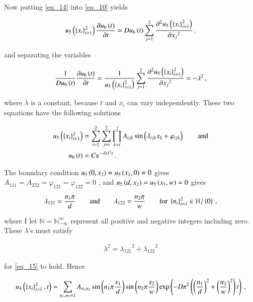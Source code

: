 \documentclass[11pt,english,a4paper]{article}
\begin{document}
\begin{flushleft}
Now putting \eqref{eq_14} into \eqref{eq_10} yields

\begin{align*}
u_5\left({\left\lbrace{x_i}\right\rbrace_{i=1}^2}\right)\frac{\partial u_6\left({t}\right)}{\partial t} = D u_6\left({t}\right)\sum_{j=1}^2\frac{\partial^2 u_5\left({\left\lbrace{x_i}\right\rbrace_{i=1}^2}\right)}{\partial {x_j}^2} \,.
\end{align*}

and separating the variables

\begin{align}
\frac{1}{Du_6\left({t}\right)} \frac{\partial u_6\left({t}\right)}{\partial t} = \frac{1}{u_5\left({\left\lbrace{x_i}\right\rbrace_{i=1}^2}\right)}\sum_{j=1}^2\frac{\partial^2 u_5\left({\left\lbrace{x_i}\right\rbrace_{i=1}^2}\right)}{\partial {x_j}^2} = -\lambda^2 \,,
\label{eq_15}
\end{align}

where $\lambda$ is a constant, because $t$ and $x_i$ can vary independently. These two equations have the following solutions

\begin{align*}
u_5\p{\kr{x_i}_{i=1}^2} &= \sum_{i=1}^2\sum_{j=i}^2 \prod_{k=i}^j A_{ijk} \sin\p{\lambda_{ijk} x_k + \varphi_{ijk}} \qquad \text{and}
\\
u_6\p{t} &= C\e^{-D\lambda^2 t}\,.
\end{align*}

The boundary condition $u_5\left({0,x_2}\right)=u_5\left({x_1,0}\right)=0$ gives $A_{111} = A_{222} = \varphi_{121}=\varphi_{122}=0$ , and $u_5\left({d,x_2}\right)=u_5\left({x_1,w}\right)=0$ gives 

\begin{align*}
\lambda_{121} = \frac{n_1\pi}{d}  \qquad \text{and} \qquad \lambda_{122} = \frac{n_2\pi}{w} \qquad \text{for } \left\lbrace{n_i}\right\rbrace_{i=1}^2 \in \mathbb{N}/\left\lbrace{0}\right\rbrace\,,
\end{align*}

where I let $\mathbb{N}=\mathbb{N}_{-\infty}^{\infty}$ represent all positive and negative integers including zero. These $\lambda$'s must satisfy

\begin{align*}
\lambda^2 = {\lambda_{121}}^2 + {\lambda_{122}}^2
\end{align*}

for \eqref{eq_15} to hold. Hence

\begin{align}
&\quad u_4\left({\left\lbrace{x_i}\right\rbrace_{i=1}^2,t}\right) = \sum_{n_1,n_2=1} A_{n_1 n_2} \sin\left({n_1\pi \frac{x_1}{d}}\right) \sin\left({n_2\pi \frac{x_2}{w}}\right) \exp\left({-D\pi^2\left({\left({\frac{n_1}{d}}\right)^2 + \left({\frac{n_2}{w}}\right)^2}\right) t}\right)\,,
\label{eq_16}
\end{align}


\end{flushleft}
\end{document}
